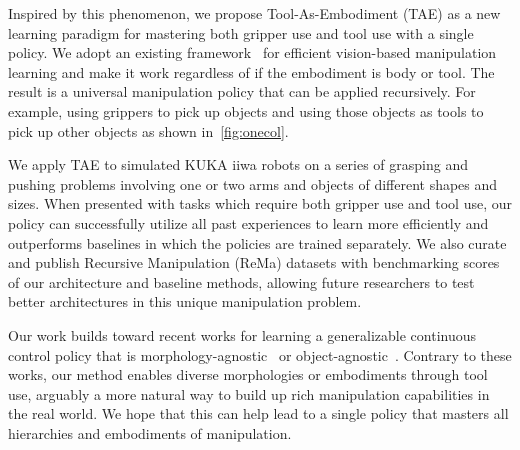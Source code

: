 \documentclass[10pt,twocolumn,letterpaper]{article}
\begin{document}
Inspired by this phenomenon, we propose Tool-As-Embodiment (TAE) as a new learning paradigm for mastering both gripper use and tool use with a single policy.
We adopt an existing framework~\cite{zeng2020transporter} for efficient vision-based manipulation learning and make it work regardless of if the embodiment is body or tool.
The result is a universal manipulation policy that can be applied recursively. For example, using grippers to pick up objects and using those objects as tools to pick up other objects as shown in~\cref{fig:onecol}. 

We apply TAE to simulated KUKA iiwa robots on a series of grasping and pushing problems involving one or two arms and objects of different shapes and sizes. When presented with tasks which require both gripper use and tool use, our policy can successfully utilize all past experiences to learn more efficiently and outperforms baselines in which the policies are trained separately. We also curate and publish Recursive Manipulation (ReMa) datasets with benchmarking scores of our architecture and baseline methods, allowing future researchers to test better architectures in this unique manipulation problem. 

Our work builds toward recent works for learning a generalizable continuous control policy that is morphology-agnostic~\cite{wang2018nervenet,huang2020one
} or object-agnostic~\cite{chen2021system,huang2021geometry}. Contrary to these works, our method enables diverse morphologies or embodiments through tool use, arguably a more natural way to build up rich manipulation capabilities in the real world. We hope that this can help lead to a single policy that masters all hierarchies and embodiments of manipulation. 



\end{document}
